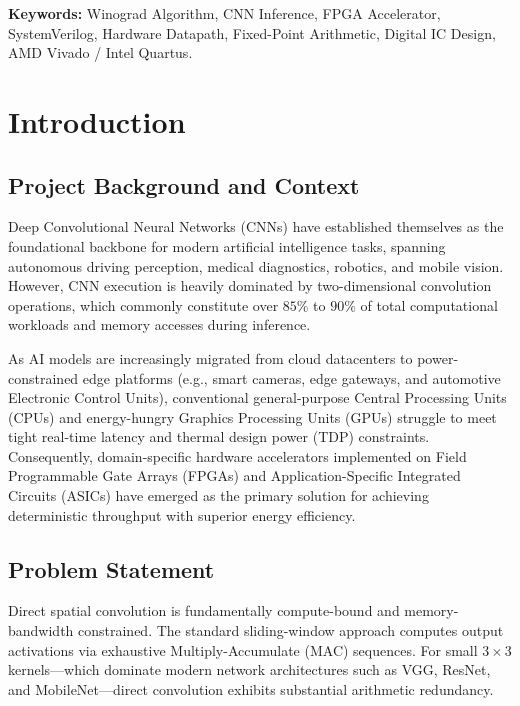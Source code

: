 \documentclass[12pt,a4paper]{article}
\begin{document}
\vspace{0.8cm}
\noindent\textbf{Keywords:} Winograd Algorithm, CNN Inference, FPGA Accelerator, SystemVerilog, Hardware Datapath, Fixed-Point Arithmetic, Digital IC Design, AMD Vivado / Intel Quartus.

\newpage
\tableofcontents
\newpage
\listoffigures
\vspace{0.5cm}
\listoftables

\newpage
{}
\setcounter{page}{1}

\section{Introduction}

\subsection{Project Background and Context}
Deep Convolutional Neural Networks (CNNs) have established themselves as the foundational backbone for modern artificial intelligence tasks, spanning autonomous driving perception, medical diagnostics, robotics, and mobile vision. However, CNN execution is heavily dominated by two-dimensional convolution operations, which commonly constitute over $85\%$ to $90\%$ of total computational workloads and memory accesses during inference.

As AI models are increasingly migrated from cloud datacenters to power-constrained edge platforms (e.g., smart cameras, edge gateways, and automotive Electronic Control Units), conventional general-purpose Central Processing Units (CPUs) and energy-hungry Graphics Processing Units (GPUs) struggle to meet tight real-time latency and thermal design power (TDP) constraints. Consequently, domain-specific hardware accelerators implemented on Field Programmable Gate Arrays (FPGAs) and Application-Specific Integrated Circuits (ASICs) have emerged as the primary solution for achieving deterministic throughput with superior energy efficiency.

\subsection{Problem Statement}
Direct spatial convolution is fundamentally compute-bound and memory-bandwidth constrained. The standard sliding-window approach computes output activations via exhaustive Multiply-Accumulate (MAC) sequences. For small $3 \times 3$ kernels—which dominate modern network architectures such as VGG, ResNet, and MobileNet—direct convolution exhibits substantial arithmetic redundancy.
\end{document}
